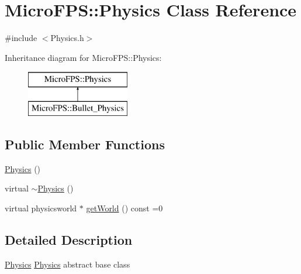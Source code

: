 \hypertarget{class_micro_f_p_s_1_1_physics}{
\section{MicroFPS::Physics Class Reference}
\label{d1/d3c/class_micro_f_p_s_1_1_physics}
}


{\ttfamily \#include $<$Physics.h$>$}

Inheritance diagram for MicroFPS::Physics:\begin{figure}[H]
\begin{center}
\leavevmode
\includegraphics[height=2.000000cm]{d1/d3c/class_micro_f_p_s_1_1_physics}
\end{center}
\end{figure}
\subsection*{Public Member Functions}
\begin{DoxyCompactItemize}
\item 
\hyperlink{class_micro_f_p_s_1_1_physics_a3bf3fa711f8928147492455497a585d3}{Physics} ()
\item 
virtual \hyperlink{class_micro_f_p_s_1_1_physics_a82f717fa1826fe7c0a9187c33ec2c994}{$\sim$Physics} ()
\item 
virtual physicsworld $\ast$ \hyperlink{class_micro_f_p_s_1_1_physics_a495b990b468be7a75c12f0e33df4f22c}{getWorld} () const =0
\end{DoxyCompactItemize}


\subsection{Detailed Description}
\hyperlink{class_micro_f_p_s_1_1_physics}{Physics} \hyperlink{class_micro_f_p_s_1_1_physics}{Physics} abstract base class 

